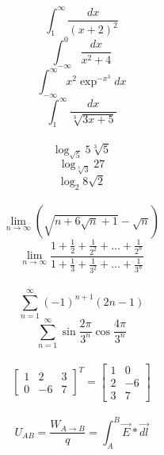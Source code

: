 \documentclass[a4paper]{article}
\begin{document}
$$ \int_1^{\infty} \frac{dx}{(x + 2)^2} $$
$$ \int_{-\infty}^{0} \frac{dx}{x^2 + 4} $$
$$ \int_{-\infty}^{\infty} x^2 \exp^{-x^3}dx $$
$$ \int_1^{\infty} \frac{dx}{\sqrt[3]{3x + 5}} $$ \\

$$ \log_{\sqrt{5}}5 \sqrt[3]{5} $$
$$ \log_{\sqrt[3]{3}}27 $$
$$ \log_2 8 \sqrt{2} $$ \\

$$ \lim_{n \rightarrow \infty} \left( \sqrt{n + 6 \sqrt{n} + 1} - \sqrt{n} \right) $$
$$ \lim_{n \rightarrow \infty} \frac{1 + \frac{1}{2} + \frac{1}{2^2} + \ldots + \frac{1}{2^n}}{1 + \frac{1}{3} + \frac{1}{3^2} + \ldots + \frac{1}{3^n}} $$ \\

$$ \sum_{n=1}^{\infty} \left(-1 \right)^{n + 1} \left( 2n - 1 \right) $$
$$ \sum_{n=1}^{\infty} \sin \frac{2 \pi}{3^n} \cos \frac{4 \pi}{3^n} $$ \\

$$ \left[ \begin{array}{clc}
	1 & 2 & 3 \\
	0 & -6 & 7
\end{array} \right]^T = \left[ \begin{array}{cl}
	1 & 0 \\
	2 & -6 \\
	3 & 7
\end{array} \right] $$ \\

$$ U_{AB} = \frac{W_{A \rightarrow B}}{q} = \int_A^B \overrightarrow{E} * \overrightarrow{dl} $$
\end{document}

